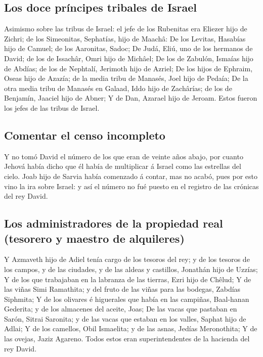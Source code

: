 \hypertarget{los-doce-pruxedncipes-tribales-de-israel}{%
\subsection{Los doce príncipes tribales de
Israel}\label{los-doce-pruxedncipes-tribales-de-israel}}

 Asimismo sobre las tribus de Israel: el jefe de los
Rubenitas era Eliezer hijo de Zichri; de los Simeonitas, Sephatías, hijo
de Maachâ:  De los Levitas, Hasabías hijo de Camuel; de
los Aaronitas, Sadoc;  De Judá, Eliú, uno de los hermanos
de David; de los de Issachâr, Omri hijo de Michâel;  De
los de Zabulón, Ismaías hijo de Abdías; de los de Nephtalí, Jerimoth
hijo de Azriel;  De los hijos de Ephraim, Oseas hijo de
Azazía; de la media tribu de Manasés, Joel hijo de Pedaía;
 De la otra media tribu de Manasés en Galaad, Iddo hijo
de Zachârías; de los de Benjamín, Jaaciel hijo de Abner; 
Y de Dan, Azarael hijo de Jeroam. Estos fueron los jefes de las tribus
de Israel.

\hypertarget{comentar-el-censo-incompleto}{%
\subsection{Comentar el censo
incompleto}\label{comentar-el-censo-incompleto}}

 Y no tomó David el número de los que eran de veinte años
abajo, por cuanto Jehová había dicho que él había de multiplicar á
Israel como las estrellas del cielo.  Joab hijo de Sarvia
había comenzado á contar, mas no acabó, pues por esto vino la ira sobre
Israel: y así el número no fué puesto en el registro de las crónicas del
rey David.

\hypertarget{los-administradores-de-la-propiedad-real-tesorero-y-maestro-de-alquileres}{%
\subsection{Los administradores de la propiedad real (tesorero y maestro
de
alquileres)}\label{los-administradores-de-la-propiedad-real-tesorero-y-maestro-de-alquileres}}

 Y Azmaveth hijo de Adiel tenía cargo de los tesoros del
rey; y de los tesoros de los campos, y de las ciudades, y de las aldeas
y castillos, Jonathán hijo de Uzzías;  Y de los que
trabajaban en la labranza de las tierras, Ezri hijo de Chêlud;
 Y de las viñas Simi Ramathita; y del fruto de las viñas
para las bodegas, Zabdías Siphmita;  Y de los olivares é
higuerales que había en las campiñas, Baal-hanan Gederita; y de los
almacenes del aceite, Joas;  De las vacas que pastaban en
Sarón, Sitrai Saronita; y de las vacas que estaban en los valles, Saphat
hijo de Adlai;  Y de los camellos, Obil Ismaelita; y de
las asnas, Jedías Meronothita;  Y de las ovejas, Jaziz
Agareno. Todos estos eran superintendentes de la hacienda del rey David.

